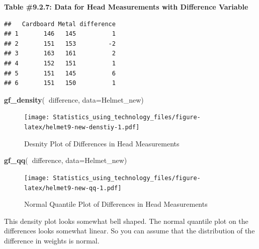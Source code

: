 \documentclass[
]{book}
\newenvironment{Shaded}{\begin{snugshade}}{\end{snugshade}}
\newcommand{\DataTypeTok}[1]{\textcolor[rgb]{0.13,0.29,0.53}{#1}}
\newcommand{\KeywordTok}[1]{\textcolor[rgb]{0.13,0.29,0.53}{\textbf{#1}}}
\newcommand{\NormalTok}[1]{#1}
\newcommand{\OperatorTok}[1]{\textcolor[rgb]{0.81,0.36,0.00}{\textbf{#1}}}
\newcommand{\StringTok}[1]{\textcolor[rgb]{0.31,0.60,0.02}{#1}}
\begin{document}
\textbf{Table \#9.2.7: Data for Head Measurements with Difference Variable}

\begin{Shaded}
\end{Shaded}

\begin{verbatim}
##   Cardboard Metal difference
## 1       146   145          1
## 2       151   153         -2
## 3       163   161          2
## 4       152   151          1
## 5       151   145          6
## 6       151   150          1
\end{verbatim}



\begin{Shaded}
\begin{Highlighting}[]
\KeywordTok{gf_density}\NormalTok{(}\OperatorTok{~}\NormalTok{difference, }\DataTypeTok{data=}\NormalTok{Helmet_new)}
\end{Highlighting}
\end{Shaded}

\begin{figure}
\centering
\texttt{[image: Statistics\_using\_technology\_files/figure-latex/helmet9-new-denstiy-1.pdf]}
\caption{\label{fig:helmet9-new-denstiy}Desnity Plot of Differences in Head Measurements}
\end{figure}



\begin{Shaded}
\begin{Highlighting}[]
\KeywordTok{gf_qq}\NormalTok{(}\OperatorTok{~}\NormalTok{difference, }\DataTypeTok{data=}\NormalTok{Helmet_new)}
\end{Highlighting}
\end{Shaded}

\begin{figure}
\centering
\texttt{[image: Statistics\_using\_technology\_files/figure-latex/helmet9-new-qq-1.pdf]}
\caption{\label{fig:helmet9-new-qq}Normal Quantile Plot of Differences in Head Measurements}
\end{figure}

This density plot looks somewhat bell shaped. The normal quantile plot on the differences looks somewhat linear. So you can assume that the distribution of the difference in weights is normal.
\end{document}
